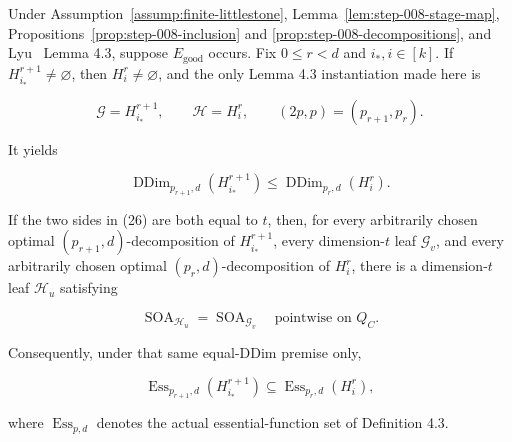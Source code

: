\begin{proposition}\label{prop:step-008-transition}
Under Assumption~\ref{assump:finite-littlestone},
Lemma~\ref{lem:step-008-stage-map},
Propositions~\ref{prop:step-008-inclusion} and
\ref{prop:step-008-decompositions}, and Lyu~\citep{lyu2025} Lemma 4.3, suppose
\(E_{\mathrm{good}}\) occurs. Fix \(0\le r<d\) and \(i_*,i\in[k]\).
If \(H_{i_*}^{r+1}\ne\varnothing\), then \(H_i^r\ne\varnothing\), and the
only Lemma 4.3 instantiation made here is

\[
 \mathcal G=H_{i_*}^{r+1},\qquad
 \mathcal H=H_i^r,\qquad
 (2p,p)=(p_{r+1},p_r).
\tag{25}
\]

It yields

\[
 \operatorname{DDim}_{p_{r+1},d}(H_{i_*}^{r+1})
 \le
 \operatorname{DDim}_{p_r,d}(H_i^r).
\tag{26}
\]

If the two sides in (26) are both equal to \(t\), then, for every
arbitrarily chosen optimal \((p_{r+1},d)\)-decomposition of
\(H_{i_*}^{r+1}\), every dimension-\(t\) leaf \(\mathcal G_v\), and every
arbitrarily chosen optimal \((p_r,d)\)-decomposition of \(H_i^r\), there
is a dimension-\(t\) leaf \(\mathcal H_u\) satisfying

\[
 \operatorname{SOA}_{\mathcal H_u}
 =\operatorname{SOA}_{\mathcal G_v}
 \quad\text{pointwise on }Q_C.
\tag{27}
\]

Consequently, under that same equal-DDim premise only,

\[
 \operatorname{Ess}_{p_{r+1},d}(H_{i_*}^{r+1})
 \subseteq
 \operatorname{Ess}_{p_r,d}(H_i^r),
\tag{28}
\]

where \(\operatorname{Ess}_{p,d}\) denotes the actual essential-function
set of Definition 4.3.


\end{proposition}

